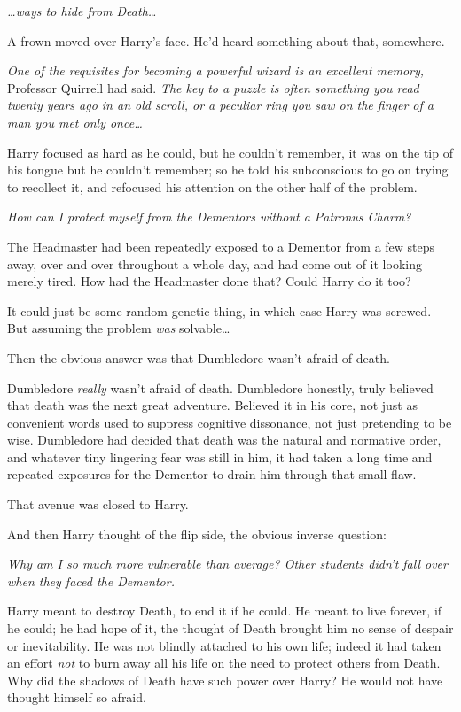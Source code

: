 \emph{{\ldots}ways to hide from Death{\ldots}}

A frown moved over Harry's face. He'd heard something about that, somewhere.

\emph{One of the requisites for becoming a powerful wizard is an excellent memory,} Professor Quirrell had said. \emph{The key to a puzzle is often something you read twenty years ago in an old scroll, or a peculiar ring you saw on the finger of a man you met only once{\ldots}}

Harry focused as hard as he could, but he couldn't remember, it was on the tip of his tongue but he couldn't remember; so he told his subconscious to go on trying to recollect it, and refocused his attention on the other half of the problem.

\emph{How can I protect myself from the Dementors without a Patronus Charm?}

The Headmaster had been repeatedly exposed to a Dementor from a few steps away, over and over throughout a whole day, and had come out of it looking merely tired. How had the Headmaster done that? Could Harry do it too?

It could just be some random genetic thing, in which case Harry was screwed. But assuming the problem \emph{was} solvable{\ldots}

Then the obvious answer was that Dumbledore wasn't afraid of death.

Dumbledore \emph{really} wasn't afraid of death. Dumbledore honestly, truly believed that death was the next great adventure. Believed it in his core, not just as convenient words used to suppress cognitive dissonance, not just pretending to be wise. Dumbledore had decided that death was the natural and normative order, and whatever tiny lingering fear was still in him, it had taken a long time and repeated exposures for the Dementor to drain him through that small flaw.

That avenue was closed to Harry.

And then Harry thought of the flip side, the obvious inverse question:

\emph{Why am I so much more vulnerable than average? Other students didn't fall over when they faced the Dementor.}

Harry meant to destroy Death, to end it if he could. He meant to live forever, if he could; he had hope of it, the thought of Death brought him no sense of despair or inevitability. He was not blindly attached to his own life; indeed it had taken an effort \emph{not} to burn away all his life on the need to protect others from Death. Why did the shadows of Death have such power over Harry? He would not have thought himself so afraid.

